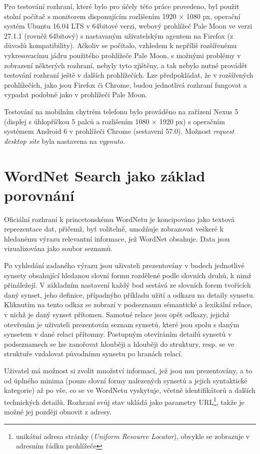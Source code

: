 \documentclass[a4paper, 11pt, oneside]{book}
\begin{document}
				Pro testování rozhraní, které bylo pro účely této práce provedeno, byl použit stolní počítač s monitorem disponujícím rozlišením 1920 × 1080 px, operační systém Ubuntu 16.04 LTS v 64bitové verzi, webový prohlížeč Pale Moon ve verzi 27.1.1 (rovněž 64bitový) s nastavaným uživatelským agentem na Firefox (z důvodů kompatibility). Ačkoliv se počítalo, vzhledem k nepříliš rozšířenému vykresovacímu jádru použitého prohlížeče Pale Moon, s možnými problémy v zobrazení některých rozhraní, nebyly tyto zjištěny, a tak nebylo nutné provádět testování rozhraní ještě v dalších prohlížečích. Lze předpokládat, že v rozšířených prohlížečích, jako jsou Firefox či Chrome, budou jednotlivá rozhraní fungovat a vypadat podobně jako v prohlížeči Pale Moon.

				Testování na mobilním chytrém telefonu bylo prováděno na zařízení Nexus 5 (displej s úhlopříčkou 5 palců a rozlišením 1080 × 1920 px) s operačním systémem Android 6 v prohlížeči Chrome (sestavení 57.0). Možnost \textit{request desktop site} byla nastavena na \textit{vypnuto}.

			\section{WordNet Search jako základ porovnání}
			\label{wnvis:wnsearch}

				Oficiální rozhraní k princetonskému WordNetu je koncipováno jako textová reprezentace dat, přičemž, byť volitelně, umožňuje zobrazovat veškeré k hledanému výrazu relevantní informace, jež WordNet obsahuje. Data jsou vizualizována jako soubor seznamů.

				Po vyhledání zadaného výrazu jsou uživateli prezentovány v bodech jednotlivé synsety obsahující hledanou slovní formu rozdělené podle slovních druhů, k nimž přináležejí. V základním nastavení každý bod sestává ze slovních forem tvořících daný synset, jeho definice, případnýho příkladu užití a odkazu na detaily synsetu. Kliknutím na tento odkaz se zobrazí v podseznamu sémantické a lexikální relace, v nichž je daný synset přítomen. Samotné relace jsou opět odkazy, jejichž otevřením je uživateli prezentován seznam synsetů, které jsou spolu s daným synsetem v dané relaci přítomny. Postupným otevíráním detailů synsetů v podseznamech se lze zanořovat hlouběji a hlouběji do struktury, resp. se ve struktuře vzdalovat původnímu synsetu po hranách relací.

				Uživatel má možnost si zvolit množství informací, jež jsou mu prezentovány, a to od úplného minima (pouze slovní formy nalezených synsetů a jejich syntaktické kategorie) až po vše, co se ve WordNetu vyskytuje, včetně identifikátorů a dalších technických detailů. Rozhraní svůj stav ukládá jako parametry URL\footnote{unikátní adresa stránky (\textit{Uniform Resource Locator}), obvykle se zobrazuje v adresním řádku prohlížeče}, takže je možné jej později obnovit z adresy.
\end{document}
